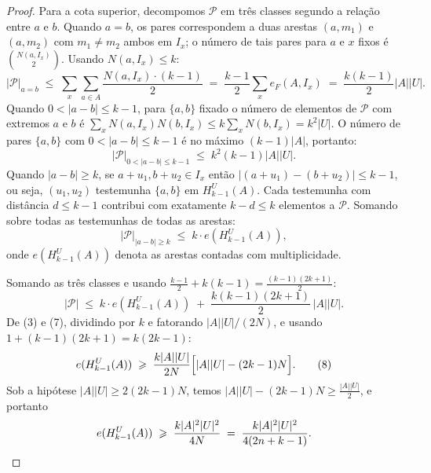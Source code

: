 \documentclass[reqno,a4paper,12pt]{amsart}
\begin{document}
\begin{proof}
  Para a cota superior, decompomos $\mathcal{P}$ em três classes segundo a relação
  entre $a$ e $b$. Quando $a = b$, os pares correspondem a duas arestas $(a, m_1)$ e
  $(a, m_2)$ com $m_1 \neq m_2$ ambos em $I_x$; o número de tais pares para $a$ e $x$
  fixos é $\binom{N(a,I_x)}{2}$. Usando $N(a, I_x) \leq k$:
  \[
    |\mathcal{P}|_{a=b}
    \;\leq\; \sum_x \sum_{a \in A}\frac{N(a,I_x)\cdot(k-1)}{2}
    \;=\; \frac{k-1}{2}\sum_x e_F(A,I_x)
    \;=\; \frac{k(k-1)}{2}|A||U|. \tag{4}
  \]
  Quando $0 < |a-b| \leq k-1$, para $\{a,b\}$ fixado o número de elementos de $\mathcal{P}$
  com extremos $a$ e $b$ é $\sum_x N(a,I_x)N(b,I_x) \leq k\sum_x N(b,I_x) = k^2|U|$.
  O número de pares $\{a,b\}$ com $0 < |a-b| \leq k-1$ é no máximo $(k-1)|A|$, portanto:
  \[
    |\mathcal{P}|_{0<|a-b|\leq k-1}
    \;\leq\; k^2(k-1)|A||U|. \tag{5}
  \]
  Quando $|a-b| \geq k$, se $a+u_1, b+u_2 \in I_x$ então $|(a+u_1)-(b+u_2)| \leq k-1$,
  ou seja, $(u_1,u_2)$ testemunha $\{a,b\}$ em $H_{k-1}^U(A)$. Cada testemunha com
  distância $d \leq k-1$ contribui com exatamente $k-d \leq k$ elementos a $\mathcal{P}$.
  Somando sobre todas as testemunhas de todas as arestas:
  \[
    |\mathcal{P}|_{|a-b|\geq k}
    \;\leq\; k\cdot e(H_{k-1}^U(A)), \tag{6}
  \]
  onde $e(H_{k-1}^U(A))$ denota as arestas contadas com multiplicidade.

  Somando as três classes e usando $\frac{k-1}{2} + k(k-1) = \frac{(k-1)(2k+1)}{2}$:
  \[
    |\mathcal{P}|
    \;\leq\;
    k\cdot e(H_{k-1}^U(A))
    \;+\; \frac{k(k-1)(2k+1)}{2}\,|A||U|. \tag{7}
  \]
  De (3) e (7), dividindo por $k$ e fatorando $|A||U|/(2N)$, e usando
  $1 + (k-1)(2k+1) = k(2k-1)$:
  \[
    e(H_{k-1}^U(A))
    \;\geq\;
    \frac{k|A||U|}{2N}
    \Bigl[|A||U| - (2k-1)N\Bigr]. \tag{8}
  \]
  Sob a hipótese $|A||U| \geq 2(2k-1)N$, temos $|A||U| - (2k-1)N \geq \frac{|A||U|}{2}$,
  e portanto
  \[
    e(H_{k-1}^U(A))
    \;\geq\;
    \frac{k|A|^2|U|^2}{4N}
    \;=\;
    \frac{k|A|^2|U|^2}{4(2n+k-1)}. \qedhere
  \]
\end{proof}
\end{document}
